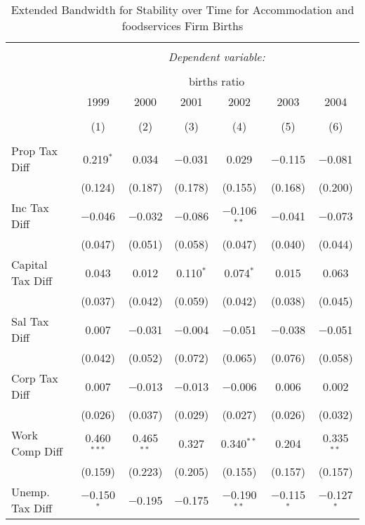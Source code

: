 
\begin{table}[!htbp] \centering 
  \caption{Extended Bandwidth for Stability over Time for  Accommodation and foodservices Firm Births} 
  \label{72 ebyear} 
\small 
\begin{tabular}{@{\extracolsep{5pt}}lcccccc} 
\\[-1.8ex]\hline 
\hline \\[-1.8ex] 
 & \multicolumn{6}{c}{\textit{Dependent variable:}} \\ 
\cline{2-7} 
\\[-1.8ex] & \multicolumn{6}{c}{births ratio} \\ 
 & 1999 & 2000 & 2001 & 2002 & 2003 & 2004 \\ 
\\[-1.8ex] & (1) & (2) & (3) & (4) & (5) & (6)\\ 
\hline \\[-1.8ex] 
 Prop Tax Diff & 0.219$^{*}$ & 0.034 & $-$0.031 & 0.029 & $-$0.115 & $-$0.081 \\ 
  & (0.124) & (0.187) & (0.178) & (0.155) & (0.168) & (0.200) \\ 
  Inc Tax Diff & $-$0.046 & $-$0.032 & $-$0.086 & $-$0.106$^{**}$ & $-$0.041 & $-$0.073 \\ 
  & (0.047) & (0.051) & (0.058) & (0.047) & (0.040) & (0.044) \\ 
  Capital Tax Diff & 0.043 & 0.012 & 0.110$^{*}$ & 0.074$^{*}$ & 0.015 & 0.063 \\ 
  & (0.037) & (0.042) & (0.059) & (0.042) & (0.038) & (0.045) \\ 
  Sal Tax Diff & 0.007 & $-$0.031 & $-$0.004 & $-$0.051 & $-$0.038 & $-$0.051 \\ 
  & (0.042) & (0.052) & (0.072) & (0.065) & (0.076) & (0.058) \\ 
  Corp Tax Diff & 0.007 & $-$0.013 & $-$0.013 & $-$0.006 & 0.006 & 0.002 \\ 
  & (0.026) & (0.037) & (0.029) & (0.027) & (0.026) & (0.032) \\ 
  Work Comp Diff & 0.460$^{***}$ & 0.465$^{**}$ & 0.327 & 0.340$^{**}$ & 0.204 & 0.335$^{**}$ \\ 
  & (0.159) & (0.223) & (0.205) & (0.155) & (0.157) & (0.157) \\ 
  Unemp. Tax Diff & $-$0.150$^{*}$ & $-$0.195 & $-$0.175 & $-$0.190$^{**}$ & $-$0.115$^{*}$ & $-$0.127$^{*}$ \\ 

\end{tabular}
\end{table}
